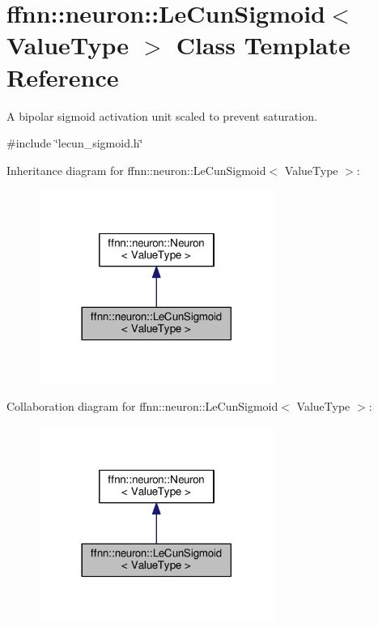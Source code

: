 \hypertarget{classffnn_1_1neuron_1_1_le_cun_sigmoid}{\section{ffnn\-:\-:neuron\-:\-:Le\-Cun\-Sigmoid$<$ Value\-Type $>$ Class Template Reference}
\label{classffnn_1_1neuron_1_1_le_cun_sigmoid}
}


A bipolar sigmoid activation unit scaled to prevent saturation.  




{\ttfamily \#include \char`\"{}lecun\-\_\-sigmoid.\-h\char`\"{}}



Inheritance diagram for ffnn\-:\-:neuron\-:\-:Le\-Cun\-Sigmoid$<$ Value\-Type $>$\-:\nopagebreak
\begin{figure}[H]
\begin{center}
\leavevmode
\includegraphics[width=218pt]{classffnn_1_1neuron_1_1_le_cun_sigmoid__inherit__graph}
\end{center}
\end{figure}


Collaboration diagram for ffnn\-:\-:neuron\-:\-:Le\-Cun\-Sigmoid$<$ Value\-Type $>$\-:\nopagebreak
\begin{figure}[H]
\begin{center}
\leavevmode
\includegraphics[width=218pt]{classffnn_1_1neuron_1_1_le_cun_sigmoid__coll__graph}
\end{center}
\end{figure}
